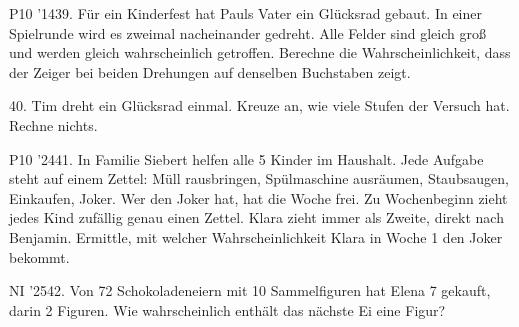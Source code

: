 \documentclass[11pt]{article}
\begin{document}
\pfgruppe{}
\begin{pfaufg}{P10 ’14}{\llap{\textasteriskcentered\,}39.}{}
Für ein Kinderfest hat Pauls Vater ein Glücksrad gebaut. In einer Spielrunde wird es zweimal nacheinander gedreht. Alle Felder sind gleich groß und werden gleich wahrscheinlich getroffen. Berechne die Wahrscheinlichkeit, dass der Zeiger bei beiden Drehungen auf denselben Buchstaben zeigt.
\par\smallskip\noindent {}\par
{}
\end{pfaufg}
\pfgruppe{}
\begin{pfaufg}{}{40.}{}
Tim dreht ein Glücksrad einmal. Kreuze an, wie viele Stufen der Versuch hat. Rechne nichts. 
\end{pfaufg}
\pfgruppe{}
\begin{pfaufg}{P10 ’24}{\llap{\textasteriskcentered\,}41.}{}
In Familie Siebert helfen alle 5 Kinder im Haushalt. Jede Aufgabe steht auf einem Zettel: Müll rausbringen, Spülmaschine ausräumen, Staubsaugen, Einkaufen, Joker. Wer den Joker hat, hat die Woche frei. Zu Wochenbeginn zieht jedes Kind zufällig genau einen Zettel. Klara zieht immer als Zweite, direkt nach Benjamin. Ermittle, mit welcher Wahrscheinlichkeit Klara in Woche 1 den Joker bekommt.
\end{pfaufg}
\pfgruppe{}
\begin{pfaufg}{NI ’25}{42.}{}
Von 72 Schokoladeneiern mit 10 Sammelfiguren hat Elena 7 gekauft, darin 2 Figuren. Wie wahrscheinlich enthält das nächste Ei eine Figur?
\end{pfaufg}
\end{document}

